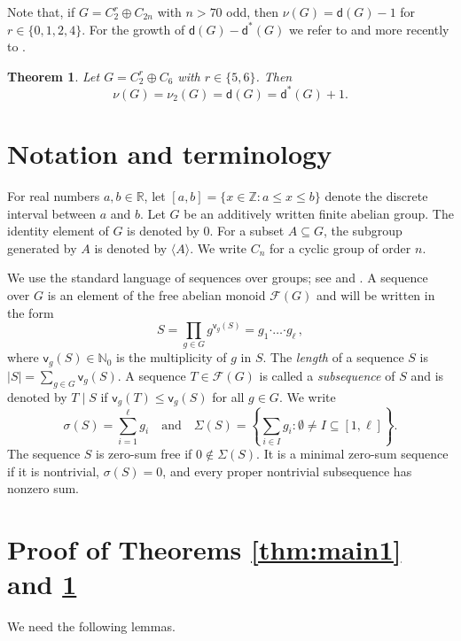 \documentclass[11pt,a4paper]{amsart}
\theoremstyle{plain}
\newtheorem{theorem}{\bf Theorem}[section]
\theoremstyle{definition}
\newcommand{\dd}{\mathsf d}
\begin{document}
Note that, if $G = C_2^r \oplus C_{2n}$ with $n>70$ odd, then $\nu (G) = \mathsf d (G)-1$ for $r \in \{0,1,2,4\}$. For the growth of $\mathsf d (G) - \mathsf d^* (G)$ we refer to \cite[Theorem 1]{Ma92} and more recently to \cite{Li20a}.


\begin{theorem}\label{thm:main2}
Let $G=C_2^r \oplus C_6$ with $r\in \{5,6\}$. Then $$\nu(G)=\nu_2(G)=\dd(G)=\mathsf d^* (G)+1.$$
\end{theorem}



\section{Notation and terminology}\label{sec:criterion}

For real numbers $a,b\in \mathbb{R}$, let $[a,b]=\{x\in \mathbb{Z}: a\leq x\leq b\}$ denote the discrete interval between $a$ and $b$. Let $G$ be an additively written finite abelian group.
The identity element of $G$ is denoted by $0$. For a subset
$A\subseteq G$, the subgroup generated by $A$ is denoted by
$\langle A\rangle$. We write $C_n$ for a cyclic group of order $n$.


We use the standard language of sequences over groups;  see \cite{Ga-Ge06b}
 and \cite[Chapter 5]{Ge-HK06a}.  A sequence over
$G$ is an element of the free abelian monoid $\mathcal F(G)$ and will be written in the form
\[
S= \prod\limits_{g\in G} g^{\mathsf v_g(S)} = g_1\boldsymbol{\cdot}\ldots\boldsymbol{\cdot}g_\ell \,,
\]
where $\mathsf v_g(S)\in\mathbb N_0$ is the multiplicity of $g$ in $S$.
The {\sl length} of a sequence $S$ is
$|S|=\sum_{g\in G}\mathsf v_g(S)$.  A sequence $T \in \mathcal F(G)$ is called a {\it subsequence } of $S$ and is denoted by $T \mid S$ if  $\mathsf v_g(T) \le \mathsf v_g(S)$ for all $g\in G$.
We write
$$\sigma(S)=\sum_{i=1}^{\ell}g_i
 \quad\text{and}\quad
 \Sigma(S)=\left\{\sum_{i\in I}g_i:
                    \emptyset\ne I\subseteq[1,\ell]\right\}.$$
The sequence $S$ is zero-sum free if $0\notin\Sigma(S)$.
It is a minimal zero-sum sequence if it is nontrivial,
$\sigma(S)=0$, and every proper nontrivial subsequence
has nonzero sum.

\section{Proof of Theorems \ref{thm:main1} and \ref{thm:main2}}\label{sec:constructions}

We need the following lemmas.
\end{document}
